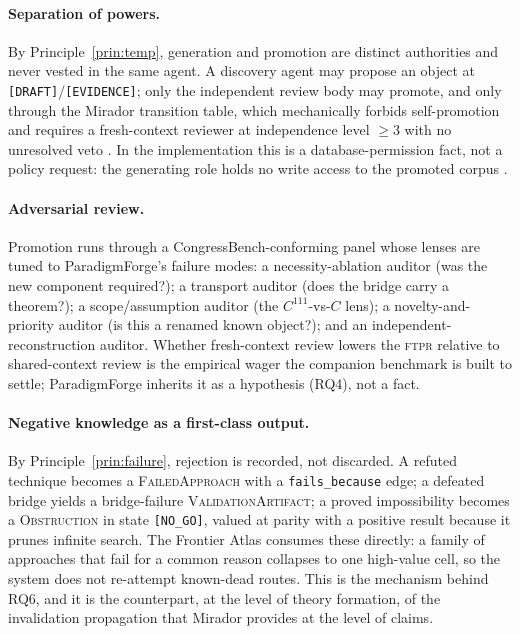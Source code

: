 \documentclass[11pt]{article}
\theoremstyle{definition}
\theoremstyle{remark}
\newcommand{\state}[1]{\texttt{[#1]}}
\newcommand{\rel}[1]{\texttt{#1}}
\newcommand{\ntype}[1]{\textsc{#1}}
\newcommand{\ftpr}{\textsc{ftpr}}
\newcommand{\PF}{ParadigmForge}
\begin{document}
\paragraph{Separation of powers.} By Principle~\ref{prin:temp}, generation and promotion are distinct
authorities and never vested in the same agent. A discovery agent may propose an object at
\state{DRAFT}/\state{EVIDENCE}; only the independent review body may promote, and only through the
Mirador transition table, which mechanically forbids self-promotion and requires a fresh-context
reviewer at independence level $\ge 3$ with no unresolved veto \citep{lucius2026mirador}. In the
implementation this is a database-permission fact, not a policy request: the generating role holds no
write access to the promoted corpus \citep{lucius2026bourbaki}.

\paragraph{Adversarial review.} Promotion runs through a CongressBench-conforming panel
\citep{lucius2026congressbench} whose lenses are tuned to \PF{}'s failure modes: a necessity-ablation
auditor (was the new component required?); a transport auditor (does the bridge carry a theorem?); a
scope/assumption auditor (the $C^{111}$-vs-$C$ lens); a novelty-and-priority auditor (is this a
renamed known object?); and an independent-reconstruction auditor. Whether fresh-context review
lowers the \ftpr{} relative to shared-context review is the empirical wager the companion benchmark
is built to settle; \PF{} inherits it as a hypothesis (RQ4), not a fact.

\paragraph{Negative knowledge as a first-class output.} By Principle~\ref{prin:failure}, rejection is
recorded, not discarded. A refuted technique becomes a \ntype{FailedApproach} with a
\rel{fails\_because} edge; a defeated bridge yields a bridge-failure \ntype{ValidationArtifact}; a
proved impossibility becomes a \ntype{Obstruction} in state \state{NO\_GO}, valued at parity with a
positive result because it prunes infinite search. The Frontier Atlas consumes these directly: a
family of approaches that fail for a common reason collapses to one high-value cell, so the system
does not re-attempt known-dead routes. This is the mechanism behind RQ6, and it is the
counterpart, at the level of theory formation, of the invalidation propagation that Mirador provides
at the level of claims.
\end{document}
